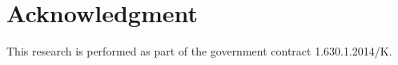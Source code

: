 \documentclass[conference]{IEEEtran}
\begin{document}


\section*{Acknowledgment}
This research is performed as part of the government contract 1.630.1.2014/K.




%
%
%
\end{document}
